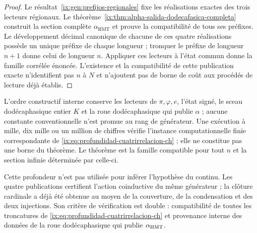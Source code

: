 \begin{proof}
Le résultat~\ref{ix:gen:prefijos-regionales} fixe les réalisations exactes
des trois lecteurs régionaux. Le
théorème~\ref{ix:thm:alpha-salida-dodecafasica-completa} construit la section
complète \(\alpha_{\mathrm{HMT}}\) et prouve la compatibilité de tous ses
préfixes. Le développement décimal canonique de chacune de ces
quatre réalisations possède un unique préfixe de chaque longueur ; tronquer le
préfixe de longueur \(n+1\) donne celui de longueur \(n\). Appliquer ces lecteurs
à l’état commun donne la famille corrélée énoncée. L’existence et la
compatibilité de cette publication exacte n’identifient pas \(n\) à \(N\)
et n’ajoutent pas de borne de coût aux procédés de lecture déjà établis.
\end{proof}

L'ordre constructif interne conserve les lecteurs de \(\pi,\varphi,e\), l'état signé, le sceau dodécaphasique entier \(K\) et la roue dodécaphasique qui publie \(\alpha\) ; aucune constante conventionnelle n'est promue au rang de générateur. Une exécution à mille, dix mille ou un million de chiffres vérifie l'instance computationnelle finie correspondante de \eqref{ix:eq:profundidad-cuatrirrelacion-ch} ; elle ne constitue pas une borne du théorème. Le théorème est la famille compatible pour tout \(n\) et la section infinie déterminée par celle-ci.

Cette profondeur n’est pas utilisée pour inférer l’hypothèse du continu. Les quatre publications
certifient l’action coinductive du même générateur ; la clôture cardinale a déjà été
obtenue au moyen de la couverture, de la condensation et des deux injections. Son
critère de vérification est double : compatibilité de toutes les troncatures
de \eqref{ix:eq:profundidad-cuatrirrelacion-ch} et provenance interne des
données de la roue dodécaphasique qui publie \(\alpha_{\rm HMT}\).
